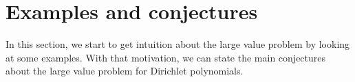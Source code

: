 \documentclass{amsart}
\begin{document}

















\section{Examples and conjectures}

In this section, we start to get intuition about the large value problem by looking at some examples.  With that motivation, we can state the main conjectures about the large value problem for Dirichlet polynomials.
\end{document}
